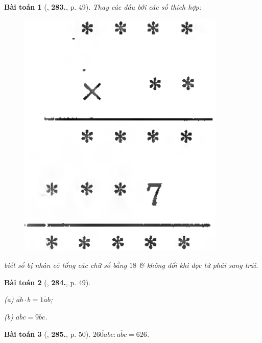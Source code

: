 \documentclass{article}
\numberwithin{equation}{section}
\newtheorem{baitoan}{Bài toán}
\begin{document}
\begin{baitoan}[\cite{Binh_Toan_6_tap_1}, \textbf{283.}, p. 49]
	Thay các dấu {\bf*} bởi các số thích hợp:
	\begin{figure}[H]
		\centering
		\includegraphics[scale=0.13]{Binh_194_p_49}
	\end{figure}
	biết số bị nhân có tổng các chữ số bằng $18$ \& không đổi khi đọc từ phải sang trái.
\end{baitoan}

\begin{baitoan}[\cite{Binh_Toan_6_tap_1}, \textbf{284.}, p. 49]
	\begin{enumerate*}
		\item[(a)] $\overline{ab}\cdot b = \overline{1ab}$;
		\item[(b)] $\overline{abc} = 9\overline{bc}$.
	\end{enumerate*}
\end{baitoan}

\begin{baitoan}[\cite{Binh_Toan_6_tap_1}, \textbf{285.}, p. 50]
	$\overline{260abc}:\overline{abc} = 626$.
\end{baitoan}
\end{document}
